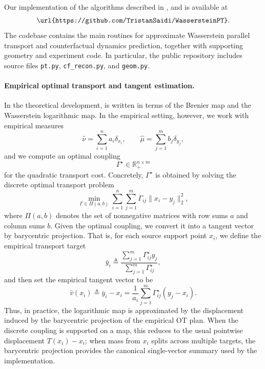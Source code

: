 \documentclass[11pt]{article}
\begin{document}
Our implementation of the algorithms described in ,  and  is available at
\[
\texttt{\url{https://github.com/TristanSaidi/WassersteinPT}}.
\]
The codebase contains the main routines for approximate Wasserstein parallel transport and
counterfactual dynamics prediction, together with supporting geometry and experiment code. In
particular, the public repository includes source files \texttt{pt.py}, \texttt{cf\_recon.py}, and
\texttt{geom.py}.

\paragraph{Empirical optimal transport and tangent estimation.}
In the theoretical development,  is written in terms of the Brenier map and the
Wasserstein logarithmic map. In the empirical setting, however, we work with empirical measures
\[
\hat \nu = \sum_{i=1}^n a_i \delta_{x_i},
\qquad
\hat \mu = \sum_{j=1}^m b_j \delta_{y_j},
\]
and we compute an optimal coupling
\[
\Gamma^\star \in \mathbb{R}_{+}^{n\times m}
\]
for the quadratic transport cost. Concretely, \(\Gamma^\star\) is obtained by solving the discrete
optimal transport problem
\[
\min_{\Gamma \in \Pi(a,b)} \sum_{i=1}^n \sum_{j=1}^m \Gamma_{ij}\|x_i-y_j\|_2^2,
\]
where \(\Pi(a,b)\) denotes the set of nonnegative matrices with row sums \(a\) and column sums
\(b\). Given the optimal coupling, we convert it into a tangent vector by barycentric projection. That is,
for each source support point \(x_i\), we define the empirical transport target
\[
\bar y_i
\triangleq
\frac{\sum_{j=1}^m \Gamma^\star_{ij} y_j}{\sum_{j=1}^m \Gamma^\star_{ij}},
\]
and then set the empirical tangent vector to be
\[
\hat v(x_i)
\triangleq
\bar y_i - x_i
=
\frac{1}{a_i}\sum_{j=1}^m \Gamma^\star_{ij}(y_j-x_i).
\]
Thus, in practice, the logarithmic map is approximated by the displacement induced by the
barycentric projection of the empirical OT plan. When the discrete coupling is supported on a map,
this reduces to the usual pointwise displacement \(T(x_i)-x_i\); when mass from \(x_i\) splits
across multiple targets, the barycentric projection provides the canonical single-vector summary
used by the implementation.
\end{document}
